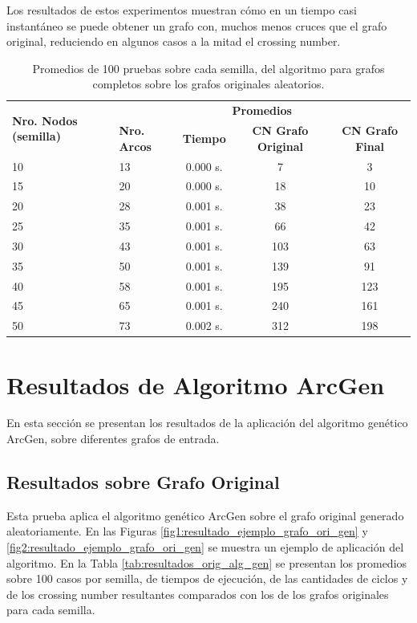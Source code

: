 Los resultados de estos experimentos muestran cómo en un tiempo casi instantáneo se puede obtener un grafo con, muchos menos cruces que el grafo original, reduciendo en algunos casos a  la mitad el crossing number.

\begin{table}
	\caption{Promedios de 100 pruebas sobre cada semilla, del algoritmo para grafos completos sobre los grafos originales aleatorios.}
	\label{tab:resultados_orig_alg_com}
	\begin{center}
	\begin{tabular}{|p{1.5cm}|p{1.2cm}|c|c|c|}
		\hline
		\multirow{2}{2cm}{\textbf{Nro. Nodos (semilla)}} & \multicolumn{4}{c|}{\textbf{Promedios}} \\
		\cline{2-5}
		& \textbf{Nro. Arcos} & \textbf{Tiempo} & \textbf{CN Grafo Original} & \textbf{CN Grafo Final} \\
		\hline
		10 & 13 & 0.000 s. & 7 & 3 \\
		\hline
		15 & 20 & 0.000 s. & 18 & 10 \\
		\hline
		20 & 28 & 0.001 s. & 38 & 23 \\
		\hline
		25 & 35 & 0.001 s. & 66 & 42 \\
		\hline
		30 & 43 & 0.001 s. & 103 & 63 \\
		\hline
		35 & 50 & 0.001 s. & 139 & 91 \\
		\hline
		40 & 58 & 0.001 s. & 195 & 123 \\
		\hline
		45 & 65 & 0.001 s. & 240 & 161 \\
		\hline
		50 & 73 & 0.002 s. & 312 & 198 \\
		\hline
	\end{tabular}
\end{center}
	\end{table}

\section{Resultados de Algoritmo ArcGen}
En esta sección se presentan los resultados de  la aplicación  del algoritmo genético ArcGen,  sobre diferentes grafos de entrada.

\subsection{Resultados sobre Grafo Original}
\label{subsec:resultados_arcgen_grafo_orig}
Esta prueba aplica el algoritmo genético ArcGen sobre el grafo original generado aleatoriamente. En las Figuras \ref{fig1:resultado_ejemplo_grafo_ori_gen} y \ref{fig2:resultado_ejemplo_grafo_ori_gen} se  muestra un ejemplo de aplicación del algoritmo. En la Tabla \ref{tab:resultados_orig_alg_gen} se presentan los promedios sobre 100 casos por semilla,  de tiempos de ejecución, de las cantidades de ciclos y de los crossing number resultantes comparados con los de los grafos originales para cada semilla.

